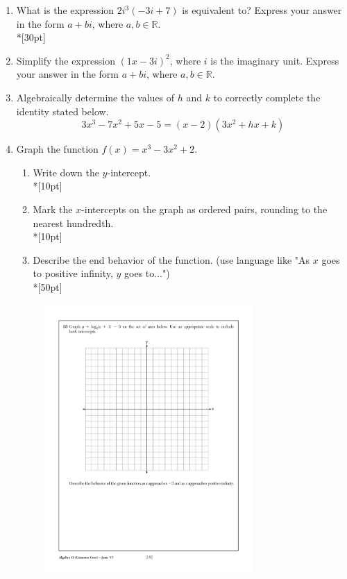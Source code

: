 \documentclass[12pt, oneside]{article}
\begin{document}
\begin{enumerate}
\item What is the expression $2i^3(-3i+7)$ is equivalent to? Express your answer in the form $a+bi$, where $a, b \in \mathbb{R}$.\\*[30pt]  %

\item Simplify the expression $(1x - 3i)^2$, where $i$ is the imaginary unit. Express your answer in the form $a+bi$, where $a, b \in \mathbb{R}$.\\[30pt] %

\item Algebraically determine the values of $h$ and $k$ to correctly complete the identity stated below.
\[3x^3-7x^2+5x-5=(x-2)(3x^2+hx+k)\] %

\newpage
\item Graph the function $f(x)=x^3-3x^2+2$. 
\begin{enumerate}
    \item Write down the $y$-intercept.\\*[10pt]
    \item Mark the $x$-intercepts on the graph as ordered pairs, rounding to the nearest hundredth.\\*[10pt]
    \item Describe the end behavior of the function. (use language like "As $x$ goes to positive infinity, $y$ goes to...")\\*[50pt]
\end{enumerate}

\begin{figure}[!ht]
    \centering
    \includegraphics[width=0.75\textwidth]{regents-grid.pdf}
\end{figure}


\end{enumerate}
\end{document}

